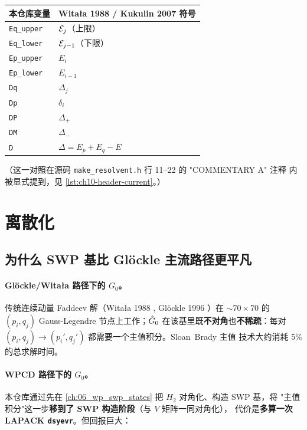 \begin{center}
\begin{tabular}{ll}
\toprule
本仓库变量 & Witała 1988 / Kukulin 2007 符号 \\
\midrule
\texttt{Eq\_upper} & \(\mathcal{E}_j\)（上限） \\
\texttt{Eq\_lower} & \(\mathcal{E}_{j-1}\)（下限） \\
\texttt{Ep\_upper} & \(E_i\) \\
\texttt{Ep\_lower} & \(E_{i-1}\) \\
\texttt{Dq}        & \(\Delta_j\) \\
\texttt{Dp}        & \(\delta_i\) \\
\texttt{DP}        & \(\Delta_{+}\) \\
\texttt{DM}        & \(\Delta_{-}\) \\
\texttt{D}         & \(\Delta = E_p + E_q - E\) \\
\bottomrule
\end{tabular}
\end{center}
（这一对照在源码 \texttt{make\_resolvent.h} 行 11--22 的 "COMMENTARY A" 注释
内被显式提到，见 \cref{lst:ch10-header-current}。）

\section{离散化}
\label{sec:ch10-discretization}

\subsection{为什么 SWP 基比 Glöckle 主流路径更平凡}
\label{subsec:ch10-why-SWP}

\paragraph{Glöckle/Witała 路径下的 \(G_0\)。}
传统连续动量 Faddeev 解（Witała 1988 \cite{Witala1988}, Glöckle 1996
\cite{Glockle1996}）在 \(\sim 70 \times 70\) 的 \((p_i, q_j)\) Gauss-Legendre
节点上工作；\(\hat{G}_0\) 在该基里既\textbf{不对角}也\textbf{不稀疏}：每对
\((p_i, q_j) \to (p_i', q_j')\) 都需要一个主值积分。Sloan~Brady 主值
技术大约消耗 5\% 的总求解时间。

\paragraph{WPCD 路径下的 \(G_0\)。}
本仓库通过先在 \cref{ch:06_wp_swp_states} 把 \(H_2\) 对角化、构造 SWP 基，将
"主值积分"这一步\textbf{移到了 SWP 构造阶段}（与 \(V\) 矩阵一同对角化），
代价是\textbf{多算一次 LAPACK \texttt{dsyevr}}。但回报巨大：

